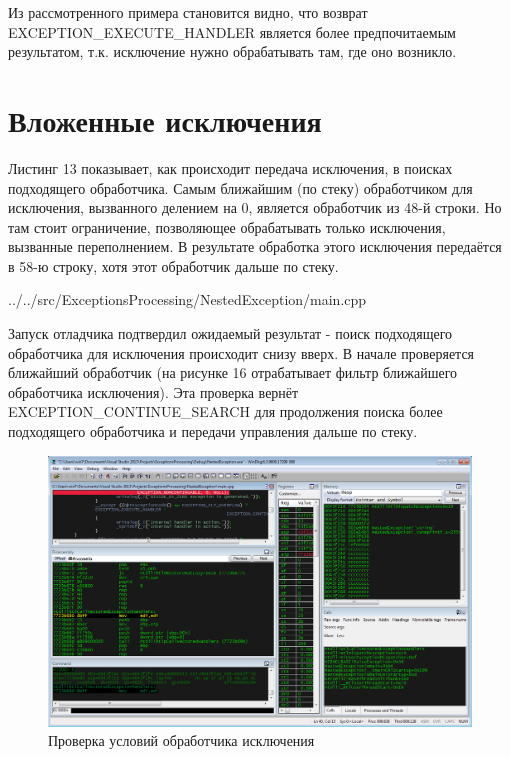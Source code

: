 \documentclass[a4paper, 12pt]{report}		%
\begin{document}


Из рассмотренного примера становится видно, что возврат EXCEPTION\_EXECUTE\_HANDLER является более предпочитаемым результатом, т.к. исключение нужно обрабатывать там, где оно возникло.


\chapter*{Вложенные исключения}

Листинг 13 показывает, как происходит передача исключения, в поисках подходящего обработчика. Самым ближайшим (по стеку) обработчиком для исключения, вызванного делением на 0, является обработчик из 48-й строки. Но там стоит ограничение, позволяющее обрабатывать только исключения, вызванные переполнением. В результате обработка этого исключения передаётся в 58-ю строку, хотя этот обработчик дальше по стеку.


{../../src/ExceptionsProcessing/NestedException/main.cpp}

Запуск отладчика подтвердил ожидаемый результат - поиск подходящего обработчика для исключения происходит снизу вверх. В начале проверяется ближайший обработчик (на рисунке 16 отрабатывает фильтр ближайшего обработчика исключения). Эта проверка вернёт EXCEPTION\_CONTINUE\_SEARCH для продолжения поиска более подходящего обработчика и передачи управления дальше по стеку.
\newpage

\begin{figure}[h!]
\centering
\includegraphics[scale=0.50]{res/009}
\caption{Проверка условий обработчика исключения}
\end{figure}
\end{document}
